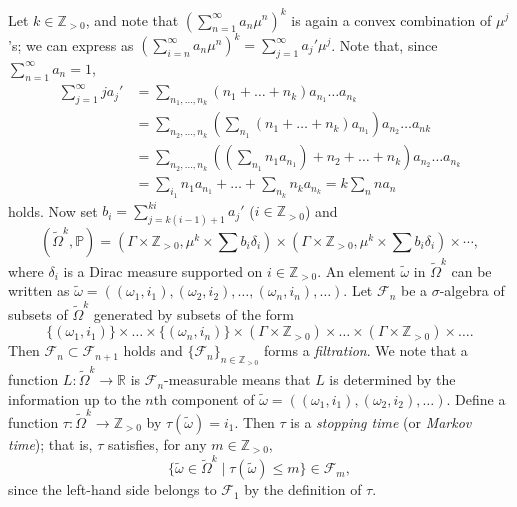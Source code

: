 \documentclass[12pt]{amsart}
\numberwithin{equation}{section}
\theoremstyle{plain}
\theoremstyle{definition}
\theoremstyle{remark}
\newcommand{\R}{{\mathbb R}}
\newcommand{\Z}{{\mathbb Z}}
\begin{document}
Let $k \in \Z_{>0}$, and note that 
$\left(\sum_{n=1}^{\infty}a_n\mu^n\right)^k$ is again a convex
combination of $\mu^j$'s; we can express as 
$\left(\sum_{i=n}^{\infty}a_n\mu^n\right)^k=\sum_{j=1}^{\infty}a_j'\mu^j$. 
Note that, since $\sum_{n=1}^{\infty} a_n =1$, 
\begin{equation*}
\begin{split}
  \sum_{j=1}^{\infty} ja_j' 
 & =\sum_{n_1, \dots, n_k} (n_1 + \dots + n_k) a_{n_1}\dots a_{n_k} \\
 & = \sum_{n_2,\dots, n_k}\left(
     \sum_{n_1}  (n_1 + \dots + n_k) a_{n_1}\right)a_{n_2} \dots a_{nk} \\
 & = \sum_{n_2,\dots, n_k} \left(\left(\sum_{n_1}n_1 a_{n_1}\right)+ 
     n_2 +  \dots + n_k\right) a_{n_2} \dots  a_{n_k} \\
 & = \sum_{i_1} n_1 a_{n_1} + \dots + \sum_{n_k}n_k a_{n_k} = k \sum_n n a_n
\end{split}
\end{equation*}
holds. 
Now set $b_i = \sum_{j=k(i-1)+1}^{ki} a_j'$ ($i\in \Z_{>0}$) and 
\begin{equation*}
 (\tilde \Omega^k,\mathbb{P}) = 
  (\Gamma \times \Z_{>0}, \mu^k \times \sum b_i
  \delta_i) \times 
 (\Gamma \times \Z_{>0}, \mu^k \times \sum b_i  \delta_i) 
 \times \cdots , 
\end{equation*}
where $\delta_i$ is a Dirac measure supported on $i \in \Z_{>0}$. 
An element $\tilde \omega$ in $\tilde \Omega^k$ can be written as 
$\tilde \omega = \left((\omega_1, i_1), (\omega_2,i_2), \dots,
(\omega_n,i_n), \dots \right)$. 
Let $\mathcal{F}_n$ be a $\sigma$-algebra of subsets of
$\tilde\Omega^k$ generated by subsets of the form
\begin{equation*}
 \{(\omega_1,i_1)\} \times \dots \times \{(\omega_n,i_n)\} \times 
  (\Gamma \times \Z_{>0}) \times \dots \times (\Gamma \times \Z_{>0})
  \times \dots .
\end{equation*}
 Then $\mathcal{F}_n\subset \mathcal{F}_{n+1}$ holds and
 $\{\mathcal{F}_n\}_{n \in \Z_{>0}}$ forms a {\it filtration}. 
 We note that a function 
 $L\colon \tilde \Omega^k\rightarrow \R$ is
 $\mathcal{F}_n$-measurable means that $L$ is determined by the
 information up to the $n$th component of 
 $\tilde\omega=((\omega_1,i_1), (\omega_2,i_2),\dots)$.
 Define a function $\tau \colon \tilde \Omega^k \rightarrow \Z_{>0}$ by
 $\tau(\tilde \omega)=i_1$.  
 Then $\tau$ is a {\it stopping time} (or {\it Markov time}); that is, 
 $\tau$ satisfies, for any $m \in \Z_{>0}$, 
\begin{equation*}
  \{\tilde\omega\in \tilde\Omega^k \mid 
    \tau(\tilde\omega) \leq m\} \in \mathcal{F}_m, 
\end{equation*}
 since the left-hand side belongs to $\mathcal{F}_1$ by the definition
 of $\tau$. 
\end{document}
